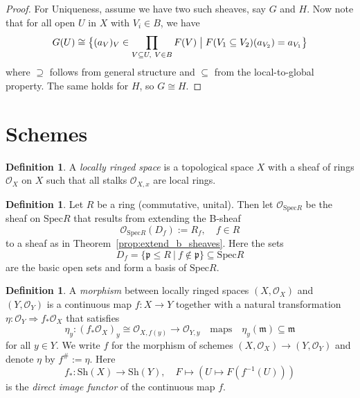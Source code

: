\documentclass{scrartcl}
\newcommand{\Spec}{\mathrm{Spec}}
\renewcommand{\O}{\mathcal{O}}
\theoremstyle{definition}
\newtheorem{definition}[prop]{Definition}
\begin{document}
\begin{proof}
    For Uniqueness, assume we have two such sheaves, say $G$ and $H$.
    Now note that for all open $U$ in $X$ with $V_i \in B$, we have
    \begin{equation*}
        G(U) \cong \bigl\{ (a_V)_V \in \prod_{V \subseteq U, \ V \in B} F(V) \bigm| F(V_1 \subseteq V_2)(a_{V_2}) = a_{V_1} \bigr\}
    \end{equation*}
    where $\supseteq$ follows from general structure and $\subseteq$ from the local-to-global property.
    The same holds for $H$, so $G \cong H$.
\end{proof}

\section{Schemes}
\begin{definition}
    A \emph{locally ringed space} is a topological space $X$ with a sheaf of rings $\O_X$ on $X$ such that all stalks $\O_{X, x}$ are local rings.
\end{definition}
\begin{definition}
    Let $R$ be a ring (commutative, unital).
    Then let $\O_{\Spec R}$ be the sheaf on $\Spec R$ that results from extending the B-sheaf
    \begin{equation*}
        \O_{\Spec R}(D_f) := R_f, \quad f \in R
    \end{equation*}
    to a sheaf as in Theorem~\ref{prop:extend_b_sheaves}.
    Here the sets
    \begin{equation*}
        D_f = \{ \mathfrak{p} \leq R \ | \ f \notin \mathfrak{p} \} \subseteq \Spec R
    \end{equation*}
    are the basic open sets and form a basis of $\Spec R$.
\end{definition}
\begin{definition}
    A \emph{morphism} between locally ringed spaces $(X, \O_X)$ and $(Y, \O_Y)$ is a continuous map $f: X \to Y$ together with a natural transformation $\eta: \O_Y \Rightarrow f_*\O_X$ that satisfies
    \begin{equation*}
        \eta_y: (f_*\O_X)_y \cong \O_{X, f(y)} \to \O_{Y, y} \quad \text{maps} \quad \eta_y(\mathfrak{m}) \subseteq \mathfrak{m}
    \end{equation*}
    for all $y \in Y$.
    We write $f$ for the morphism of schemes $(X, \O_X) \to (Y, \O_Y)$ and denote $\eta$ by $f^\# := \eta$.
    Here
    \begin{equation*}
        f_*: \mathrm{Sh}(X) \to \mathrm{Sh}(Y), \quad F \mapsto (U \mapsto F(f^{-1}(U)))
    \end{equation*}
    is the \emph{direct image functor} of the continuous map $f$.
\end{definition}
\end{document}
